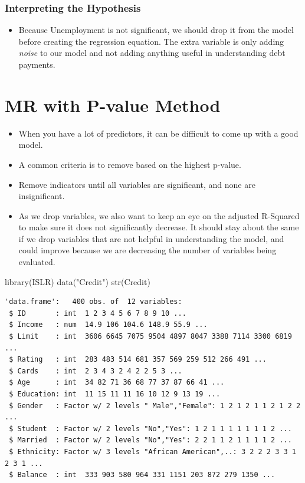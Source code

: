 \documentclass[
  letterpaper,
  DIV=11,
  numbers=noendperiod]{scrreprt}
\newenvironment{Shaded}{\begin{snugshade}}{\end{snugshade}}
\newcommand{\FunctionTok}[1]{\textcolor[rgb]{0.28,0.35,0.67}{#1}}
\newcommand{\NormalTok}[1]{\textcolor[rgb]{0.00,0.23,0.31}{#1}}
\newcommand{\StringTok}[1]{\textcolor[rgb]{0.13,0.47,0.30}{#1}}
\providecommand{\tightlist}{%
  \setlength{\itemsep}{0pt}\setlength{\parskip}{0pt}}\usepackage{longtable,booktabs,array}
\begin{document}
\subsection{Interpreting the
Hypothesis}\label{interpreting-the-hypothesis-1}

\begin{itemize}
\tightlist
\item
  Because Unemployment is not significant, we should drop it from the
  model before creating the regression equation. The extra variable is
  only adding \emph{noise} to our model and not adding anything useful
  in understanding debt payments.
\end{itemize}


\chapter{MR with P-value Method}\label{mr-with-p-value-method}

\begin{itemize}
\item
  When you have a lot of predictors, it can be difficult to come up with
  a good model.
\item
  A common criteria is to remove based on the highest p-value.
\item
  Remove indicators until all variables are significant, and none are
  insignificant.
\item
  As we drop variables, we also want to keep an eye on the adjusted
  R-Squared to make sure it does not significantly decrease. It should
  stay about the same if we drop variables that are not helpful in
  understanding the model, and could improve because we are decreasing
  the number of variables being evaluated.
\end{itemize}

\begin{Shaded}
\begin{Highlighting}[]
\FunctionTok{library}\NormalTok{(ISLR)}
\FunctionTok{data}\NormalTok{(}\StringTok{"Credit"}\NormalTok{)}
\FunctionTok{str}\NormalTok{(Credit)}
\end{Highlighting}
\end{Shaded}

\begin{verbatim}
'data.frame':   400 obs. of  12 variables:
 $ ID       : int  1 2 3 4 5 6 7 8 9 10 ...
 $ Income   : num  14.9 106 104.6 148.9 55.9 ...
 $ Limit    : int  3606 6645 7075 9504 4897 8047 3388 7114 3300 6819 ...
 $ Rating   : int  283 483 514 681 357 569 259 512 266 491 ...
 $ Cards    : int  2 3 4 3 2 4 2 2 5 3 ...
 $ Age      : int  34 82 71 36 68 77 37 87 66 41 ...
 $ Education: int  11 15 11 11 16 10 12 9 13 19 ...
 $ Gender   : Factor w/ 2 levels " Male","Female": 1 2 1 2 1 1 2 1 2 2 ...
 $ Student  : Factor w/ 2 levels "No","Yes": 1 2 1 1 1 1 1 1 1 2 ...
 $ Married  : Factor w/ 2 levels "No","Yes": 2 2 1 1 2 1 1 1 1 2 ...
 $ Ethnicity: Factor w/ 3 levels "African American",..: 3 2 2 2 3 3 1 2 3 1 ...
 $ Balance  : int  333 903 580 964 331 1151 203 872 279 1350 ...
\end{verbatim}
\end{document}

